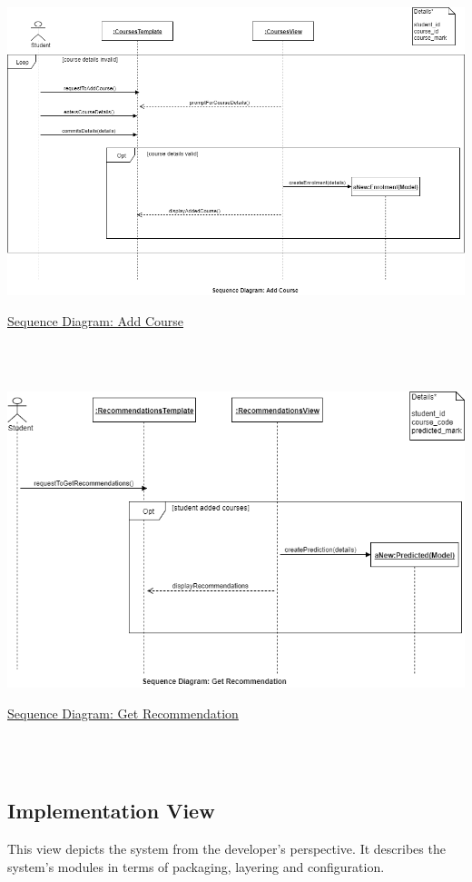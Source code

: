 \documentclass[10pt]{article}
\begin{document}
\begin{center}
\includegraphics[width=.9\textwidth]{sequence_diagram_add.png}
\end{center}
\caption{\underline{Sequence Diagram: Add Course}} \\ \\

\begin{center}
\includegraphics[width=.9\textwidth]{sequence_diagram_get.png}
\end{center}
\caption{\underline{Sequence Diagram: Get Recommendation}} \\ \\

\subsection{Implementation View}

This view depicts the system from the developer’s perspective. It describes the system’s modules in terms of packaging, layering and configuration.
\end{document}
